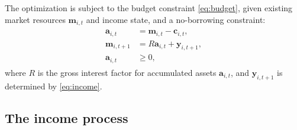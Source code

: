 \documentclass[qe,draft]{econsocart}
\theoremstyle{plain}
\theoremstyle{definition}
\begin{document}
The optimization is subject to the budget constraint \eqref{eq:budget}, given existing market resources $\mathbf{m}_{i,t}$ and income state, and a no-borrowing constraint:
\begin{equation}
  \begin{gathered}
    \begin{aligned}
      \mathbf{a}_{i,t}   & = \mathbf{m}_{i,t} - \mathbf{c}_{i,t},     \\
      \mathbf{m}_{i,t+1} & = R \mathbf{a}_{i,t} + \mathbf{y}_{i,t+1}, \\
      \mathbf{a}_{i,t}   & \geq 0,
      \label{eq:budget} %
    \end{aligned}
  \end{gathered}
\end{equation}
where $R$ is the gross interest factor for accumulated assets $\mathbf{a}_{i,t}$, and $\mathbf{y}_{i,t+1}$ is determined by \eqref{eq:income}.

\subsection{The income process}\label{the-income-process}
\end{document}

